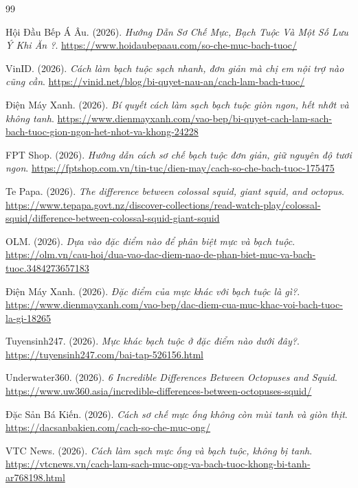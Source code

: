 \documentclass[12pt,a4paper]{report}
\begin{document}
\newpage
\renewcommand{\bibname}{Tài liệu tham khảo Chương 3}
\begin{thebibliography}{99}

 Hội Đầu Bếp Á Âu. (2026). \textit{Hướng Dẫn Sơ Chế Mực, Bạch Tuộc Và Một Số Lưu Ý Khi Ăn ?}. \url{https://www.hoidaubepaau.com/so-che-muc-bach-tuoc/}

 VinID. (2026). \textit{Cách làm bạch tuộc sạch nhanh, đơn giản mà chị em nội trợ nào cũng cần}. \url{https://vinid.net/blog/bi-quyet-nau-an/cach-lam-bach-tuoc/}

 Điện Máy Xanh. (2026). \textit{Bí quyết cách làm sạch bạch tuộc giòn ngon, hết nhớt và không tanh}. \url{https://www.dienmayxanh.com/vao-bep/bi-quyet-cach-lam-sach-bach-tuoc-gion-ngon-het-nhot-va-khong-24228}

 FPT Shop. (2026). \textit{Hướng dẫn cách sơ chế bạch tuộc đơn giản, giữ nguyên độ tươi ngon}. \url{https://fptshop.com.vn/tin-tuc/dien-may/cach-so-che-bach-tuoc-175475}

 Te Papa. (2026). \textit{The difference between colossal squid, giant squid, and octopus}. \url{https://www.tepapa.govt.nz/discover-collections/read-watch-play/colossal-squid/difference-between-colossal-squid-giant-squid}

 OLM. (2026). \textit{Dựa vào đặc điểm nào để phân biệt mực và bạch tuộc}. \url{https://olm.vn/cau-hoi/dua-vao-dac-diem-nao-de-phan-biet-muc-va-bach-tuoc.3484273657183}

 Điện Máy Xanh. (2026). \textit{Đặc điểm của mực khác với bạch tuộc là gì?}. \url{https://www.dienmayxanh.com/vao-bep/dac-diem-cua-muc-khac-voi-bach-tuoc-la-gi-18265}

 Tuyensinh247. (2026). \textit{Mực khác bạch tuộc ở đặc điểm nào dưới đây?}. \url{https://tuyensinh247.com/bai-tap-526156.html}

 Underwater360. (2026). \textit{6 Incredible Differences Between Octopuses and Squid}. \url{https://www.uw360.asia/incredible-differences-between-octopuses-squid/}

 Đặc Sản Bá Kiến. (2026). \textit{Cách sơ chế mực ống không còn mùi tanh và giòn thịt}. \url{https://dacsanbakien.com/cach-so-che-muc-ong/}

 VTC News. (2026). \textit{Cách làm sạch mực ống và bạch tuộc, không bị tanh}. \url{https://vtcnews.vn/cach-lam-sach-muc-ong-va-bach-tuoc-khong-bi-tanh-ar768198.html}


\end{thebibliography}
\end{document}

